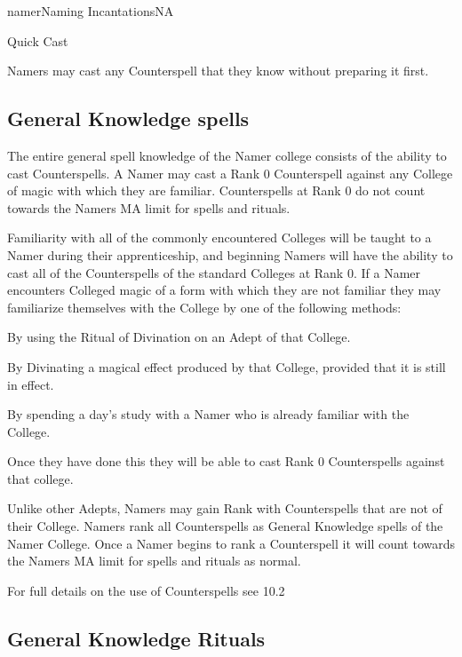 \begin{college}[2.0]{namer}{Naming Incantations}{NA}
\begin{talent}[T-3]{Quick Cast}
\begin{effects}
Namers may cast any Counterspell that they know without preparing it
first.
\end{effects}
\end{talent}

\subsection{General Knowledge spells}

The entire general spell knowledge of the Namer college consists of
the ability to cast Counterspells. A Namer may cast a Rank 0
Counterspell against any College of magic with which they are
familiar. Counterspells at Rank 0 do not count towards the Namers MA
limit for spells and rituals.

Familiarity with all of the commonly encountered Colleges will be
taught to a Namer during their apprenticeship, and beginning Namers
will have the ability to cast all of the Counterspells of the standard
Colleges at Rank 0.  If a Namer encounters Colleged magic of a form
with which they are not familiar they may familiarize themselves with
the College by one of the following methods:

\begin{Itemize}
\item By using the Ritual of Divination on an Adept of that College.

\item By Divinating a magical effect produced by that College,
provided that it is still in effect.

\item By spending a day's study with a Namer who is already familiar
with the College.
\end{Itemize}

Once they have done this they will be able to cast Rank 0
Counterspells against that college.

Unlike other Adepts, Namers may gain Rank with Counterspells that are
not of their College. Namers rank all Counterspells as General
Knowledge spells of the Namer College. Once a Namer begins to rank a
Counterspell it will count towards the Namers MA limit for spells and
rituals as normal.

For full details on the use of Counterspells see 10.2 

\subsection{General Knowledge Rituals}


\end{college}
